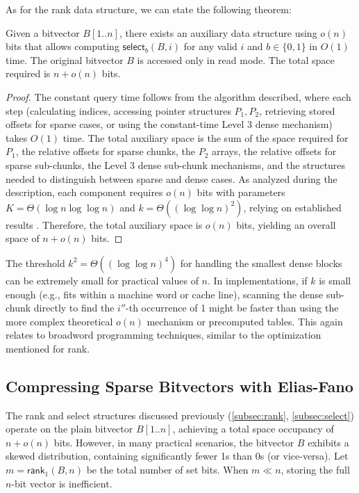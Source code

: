 As for the rank data structure, we can state the following theorem:

\begin{theorem} \label{th:select}
    Given a bitvector $B[1..n]$, there exists an auxiliary data structure using $o(n)$ bits that allows computing $\textsf{select}_b(B, i)$ for any valid $i$ and $b \in \{0,1\}$ in $O(1)$ time. The original bitvector $B$ is accessed only in read mode. The total space required is $n + o(n)$ bits.
\end{theorem}
\begin{proof}
    The constant query time follows from the algorithm described, where each step (calculating indices, accessing pointer structures $P_1, P_2$, retrieving stored offsets for sparse cases, or using the constant-time Level 3 dense mechanism) takes $O(1)$ time. The total auxiliary space is the sum of the space required for $P_1$, the relative offsets for sparse chunks, the $P_2$ arrays, the relative offsets for sparse sub-chunks, the Level 3 dense sub-chunk mechanisms, and the structures needed to distinguish between sparse and dense cases. As analyzed during the description, each component requires $o(n)$ bits with parameters $K=\Theta(\log n \log \log n)$ and $k=\Theta((\log \log n)^2)$, relying on established results \cite{clark1997compact}. Therefore, the total auxiliary space is $o(n)$ bits, yielding an overall space of $n+o(n)$ bits.
\end{proof}

\begin{remark}
    The threshold $k^2 = \Theta((\log \log n)^4)$ for handling the smallest dense blocks can be extremely small for practical values of $n$. In implementations, if $k$ is small enough (e.g., fits within a machine word or cache line), scanning the dense sub-chunk directly to find the $i''$-th occurrence of 1 might be faster than using the more complex theoretical $o(n)$ mechanism or precomputed tables. This again relates to broadword programming techniques, similar to the optimization mentioned for \textsf{rank}.
\end{remark}

\subsection{Compressing Sparse Bitvectors with Elias-Fano} \label{subsec:elias_fano_compression}

The rank and select structures discussed previously (\ref{subsec:rank}, \ref{subsec:select}) operate on the plain bitvector $B[1..n]$, achieving a total space occupancy of $n + o(n)$ bits. However, in many practical scenarios, the bitvector $B$ exhibits a skewed distribution, containing significantly fewer 1s than 0s (or vice-versa). Let $m = \textsf{rank}_1(B, n)$ be the total number of set bits. When $m \ll n$, storing the full $n$-bit vector is inefficient.

